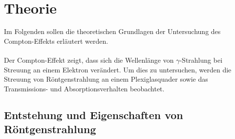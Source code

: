 \section{Theorie}
\label{sec:theorie}

    Im Folgenden sollen die theoretischen Grundlagen der Untersuchung des Compton-Effekts erläutert werden.\\
    \\
    Der Compton-Effekt zeigt,
    dass sich die Wellenlänge von $\gamma$-Strahlung bei Streuung an einem Elektron verändert.
    Um dies zu untersuchen,
    werden die Streuung von Röntgenstrahlung an einem Plexiglasquader
    sowie das Transmissions- und Absorptionsverhalten beobachtet.

\subsection{Entstehung und Eigenschaften von Röntgenstrahlung}
\label{sec:röntgen}

